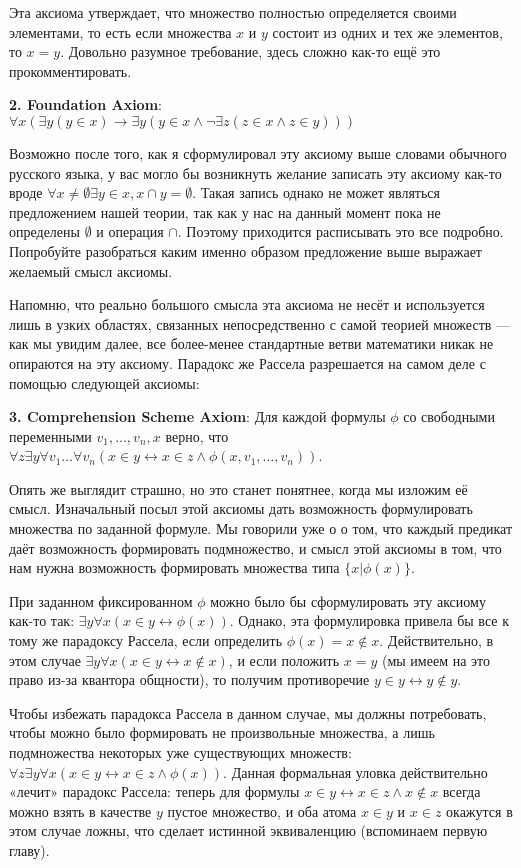 Эта аксиома утверждает, что множество полностью определяется своими элементами, то есть если множества $x$ и $y$ состоит из одних и тех же элементов, то $x=y$. Довольно разумное требование, здесь сложно как-то ещё это прокомментировать.

{\bfseries 2. Foundation Axiom}: $\forall x(\exists y (y\in x)\rightarrow \exists y(y\in x\wedge \neg \exists z (z\in x \wedge z\in y)))$

Возможно после того, как я сформулировал эту аксиому выше словами обычного русского языка, у вас могло бы возникнуть желание записать эту аксиому как-то вроде $\forall x \not= \emptyset \exists y\in x, x\cap y = \emptyset$. Такая запись однако не может являться предложением нашей теории, так как у нас на данный момент пока не определены $\emptyset$ и операция $\cap$. Поэтому приходится расписывать это все подробно. Попробуйте разобраться каким именно образом предложение выше выражает желаемый смысл аксиомы.

Напомню, что реально большого смысла эта аксиома не несёт и используется лишь в узких областях, связанных непосредственно с самой теорией множеств — как мы увидим далее, все более-менее стандартные ветви математики никак не опираются на эту аксиому. Парадокс же Рассела разрешается на самом деле с помощью следующей аксиомы:

{\bfseries 3. Comprehension Scheme Axiom}: Для каждой формулы $\phi$ со свободными переменными $v_1, \ldots, v_n, x$ верно, что $\forall z \exists y \forall v_1 \ldots \forall v_n (x\in y \leftrightarrow x \in z \wedge \phi(x, v_1, \ldots, v_n))$.

Опять же выглядит страшно, но это станет понятнее, когда мы изложим её смысл. Изначальный посыл этой аксиомы дать возможность формулировать множества по заданной формуле. Мы говорили уже о о том, что каждый предикат даёт возможность формировать подмножество, и смысл этой аксиомы в том, что нам нужна возможность формировать множества типа $\{x|\phi(x)\}$.

При заданном фиксированном $\phi$ можно было бы сформулировать эту аксиому как-то так: $\exists y \forall x (x\in y \leftrightarrow \phi(x))$. Однако, эта формулировка привела бы все к тому же парадоксу Рассела, если определить $\phi(x) = x \not \in x$. Действительно, в этом случае $\exists y \forall x (x\in y \leftrightarrow x\not \in x)$, и если положить $x=y$ (мы имеем на это право из-за квантора общности), то получим противоречие $y \in y \leftrightarrow y\not \in y$.

Чтобы избежать парадокса Рассела в данном случае, мы должны потребовать, чтобы можно было формировать не произвольные множества, а лишь подмножества некоторых уже существующих множеств: $\forall z \exists y \forall x (x\in y \leftrightarrow x \in z \wedge \phi(x))$. Данная формальная уловка действительно «лечит» парадокс Рассела: теперь для формулы $x \in y \leftrightarrow x \in z \wedge x\not \in x$ всегда можно взять в качестве $y$ пустое множество, и оба атома $x \in y$ и $x \in z$ окажутся в этом случае ложны, что сделает истинной эквиваленцию (вспоминаем первую главу).

